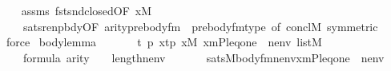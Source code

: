 \begin{isabellebody}
%
\isadelimproof
\ \ %
\endisadelimproof
%
\isatagproof
{}\isamarkupfalse%
\ assms\ fst{\isacharunderscore}{\kern0pt}snd{\isacharunderscore}{\kern0pt}closed{\isacharbrackleft}{\kern0pt}OF\ {\isacartoucheopen}x{\isasymin}M{\isacartoucheclose}{\isacharbrackright}{\kern0pt}\isanewline
\ \ \ \ sats{\isacharunderscore}{\kern0pt}renpbdy{\isacharbrackleft}{\kern0pt}OF\ arity{\isacharunderscore}{\kern0pt}prebody{\isacharunderscore}{\kern0pt}fm\ {\isacharunderscore}{\kern0pt}\ prebody{\isacharunderscore}{\kern0pt}fm{\isacharunderscore}{\kern0pt}type{\isacharcomma}{\kern0pt}\ of\ concl{\isacharcolon}{\kern0pt}M{\isacharcomma}{\kern0pt}\ symmetric{\isacharbrackright}{\kern0pt}\isanewline
\ \ \isamarkupfalse%
\ force%
\endisatagproof
{\isafoldproof}%
%
\isadelimproof
\isanewline
%
\endisadelimproof
\isanewline
{}\isamarkupfalse%
\ body{\isacharunderscore}{\kern0pt}lemma{\isacharcolon}{\kern0pt}\isanewline
\ \ \isanewline
\ \ \ \ {\isachardoublequoteopen}{\isasymexists}t\ p{\isachardot}{\kern0pt}\ x{\isacharequal}{\kern0pt}{\isasymlangle}t{\isacharcomma}{\kern0pt}p{\isasymrangle}{\isachardoublequoteclose}\ {\isachardoublequoteopen}x{\isasymin}M{\isachardoublequoteclose}\ {\isachardoublequoteopen}{\isacharbrackleft}{\kern0pt}x{\isacharcomma}{\kern0pt}{\isasymalpha}{\isacharcomma}{\kern0pt}m{\isacharcomma}{\kern0pt}P{\isacharcomma}{\kern0pt}leq{\isacharcomma}{\kern0pt}one{\isacharbrackright}{\kern0pt}\ {\isacharat}{\kern0pt}\ nenv\ {\isasymin}list{\isacharparenleft}{\kern0pt}M{\isacharparenright}{\kern0pt}{\isachardoublequoteclose}\isanewline
\ \ \ \ {\isachardoublequoteopen}{\isasymphi}{\isasymin}formula{\isachardoublequoteclose}\ {\isachardoublequoteopen}arity{\isacharparenleft}{\kern0pt}{\isasymphi}{\isacharparenright}{\kern0pt}\ {\isasymle}\ {}\ {\isacharhash}{\kern0pt}{\isacharplus}{\kern0pt}\ length{\isacharparenleft}{\kern0pt}nenv{\isacharparenright}{\kern0pt}{\isachardoublequoteclose}\isanewline
\ \ \isanewline
\ \ \ \ {\isachardoublequoteopen}sats{\isacharparenleft}{\kern0pt}M{\isacharcomma}{\kern0pt}body{\isacharunderscore}{\kern0pt}fm{\isacharparenleft}{\kern0pt}{\isasymphi}{\isacharcomma}{\kern0pt}nenv{\isacharparenright}{\kern0pt}{\isacharcomma}{\kern0pt}{\isacharbrackleft}{\kern0pt}{\isasymalpha}{\isacharcomma}{\kern0pt}x{\isacharcomma}{\kern0pt}m{\isacharcomma}{\kern0pt}P{\isacharcomma}{\kern0pt}leq{\isacharcomma}{\kern0pt}one{\isacharbrackright}{\kern0pt}\ {\isacharat}{\kern0pt}\ nenv{\isacharparenright}{\kern0pt}\ {\isasymlongleftrightarrow}\isanewline

\end{isabellebody}
